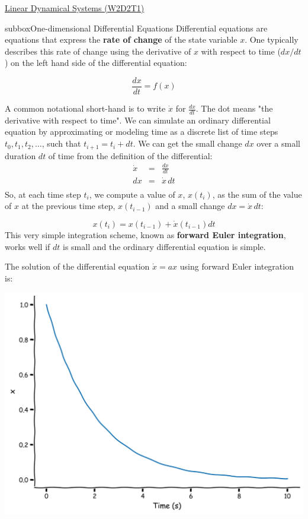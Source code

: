 \begin{textbox}{\href{https://compneuro.neuromatch.io/tutorials/W2D2_LinearSystems/student/W2D2_Tutorial1.html}{Linear Dynamical Systems (W2D2T1)}   }
\begin{subbox}{subbox}{One-dimensional Differential Equations}
\scriptsize
Differential equations are equations that express the \textbf{rate of change} of the state variable $x$. One typically describes this rate of change using the derivative of $x$ with respect to time ($dx/dt$) on the left hand side of the differential equation:

$$\frac{dx}{dt} = f(x)$$

A common notational short-hand is to write $\dot{x}$ for $\frac{dx}{dt}$. The dot means "the derivative with respect to time".
We can simulate an ordinary differential equation by approximating or modeling time as a discrete list of time steps $t_0, t_1, t_2, \dots$, such that $t_{i+1}=t_i+dt$. We can get the small change $dx$ over a small duration $dt$ of time from the definition of the differential:
\begin{eqnarray}
  \dot x &=& \frac{dx}{dt} \\
  dx     &=& \dot x\, dt  \\
\end{eqnarray}
So, at each time step $t_i$, we compute a value of $x$, $x(t_i)$, as the sum of the value of $x$ at the previous time step, $x(t_{i-1})$ and a small change $dx=\dot x\,dt$:

$$x(t_i)=x(t_{i-1})+\dot x(t_{i-1}) dt$$
This very simple integration scheme, known as \textbf{forward Euler integration}, works well if $dt$ is small and the ordinary differential equation is simple.

The solution of the differential equation $\dot{x} = a x$ using forward Euler integration is: 

\centering
\includegraphics[scale=0.15]{Figures/LS/LSFigure1.png}
\end{subbox}
\end{textbox}
